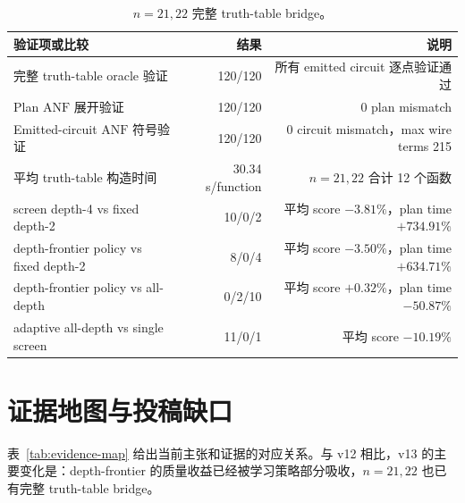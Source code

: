 \documentclass[UTF8,fontset=macnew,11pt]{ctexart}
\newcommand{\anf}{\ensuremath{\mathrm{ANF}}}
\newcommand{\ttable}{truth-table}
\begin{document}
\begin{table}[H]
\centering
\scriptsize
\caption{$n=21,22$ 完整 truth-table bridge。}
\label{tab:truth-bridge}
\begin{tabular}{lrr}
\toprule
验证项或比较 & 结果 & 说明 \\
\midrule
完整 \ttable{} oracle 验证 & 120/120 & 所有 emitted circuit 逐点验证通过 \\
Plan \anf{} 展开验证 & 120/120 & 0 plan mismatch \\
Emitted-circuit \anf{} 符号验证 & 120/120 & 0 circuit mismatch，max wire terms 215 \\
平均 truth-table 构造时间 & 30.34 s/function & $n=21,22$ 合计 12 个函数 \\
screen depth-4 vs fixed depth-2 & 10/0/2 & 平均 score $-3.81\%$，plan time $+734.91\%$ \\
depth-frontier policy vs fixed depth-2 & 8/0/4 & 平均 score $-3.50\%$，plan time $+634.71\%$ \\
depth-frontier policy vs all-depth & 0/2/10 & 平均 score $+0.32\%$，plan time $-50.87\%$ \\
adaptive all-depth vs single screen & 11/0/1 & 平均 score $-10.19\%$ \\
\bottomrule
\end{tabular}
\end{table}

\section{证据地图与投稿缺口}

表~\ref{tab:evidence-map} 给出当前主张和证据的对应关系。与 v12 相比，v13 的主要变化是：depth-frontier 的质量收益已经被学习策略部分吸收，$n=21,22$ 也已有完整 \ttable{} bridge。
\end{document}
